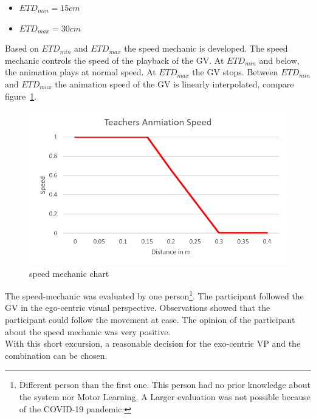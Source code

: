 \begin{itemize}
	\item[] $ETD_{min}=15cm$
	\item[] $ETD_{max}=30cm$
\end{itemize}
Based on $ETD_{min}$ and $ETD_{max}$ the speed mechanic is developed. The speed mechanic controls the speed of the playback of the GV. At $ETD_{min}$ and below, the animation plays at normal speed. At $ETD_{max}$ the GV stops. Between $ETD_{min}$ and $ETD_{max}$ the animation speed of the GV is linearly interpolated, compare figure~\ref{fig:speed_mechanic}.
\begin{figure}[htb]
	\centering
	\includegraphics[width=\textwidth]{figures/speed_mechanic_chart.png}
	\caption[speed mechanic chart]{speed mechanic chart}
	\label{fig:speed_mechanic}
\end{figure}
The speed-mechanic was evaluated by one person\footnote{Different person than the first one. This person had no prior knowledge about the system nor Motor Learning. A Larger evaluation was not possible because of the COVID-19 pandemic.}. The participant followed the GV in the ego-centric visual perspective. Observations showed that the participant could follow the movement at ease. The opinion of the participant about the speed mechanic was very positive.\\
With this short excursion, a reasonable decision for the exo-centric VP and the combination can be chosen.\\

